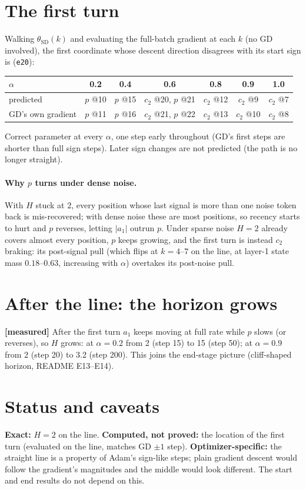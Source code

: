 \documentclass[11pt]{article}
\theoremstyle{remark}\newtheorem{remark}{Remark}
\begin{document}
\section{The first turn}
Walking $\theta_{\mathrm{SD}}(k)$ and evaluating the full-batch gradient at each $k$ (no GD involved),
the first coordinate whose descent direction disagrees with its start sign is (\texttt{e20}):
\begin{center}\begin{tabular}{lcccccc}\toprule
$\alpha$ & 0.2 & 0.4 & 0.6 & 0.8 & 0.9 & 1.0\\\midrule
predicted & $p$ @10 & $p$ @15 & $c_2$ @20, $p$ @21 & $c_2$ @12 & $c_2$ @9 & $c_2$ @7\\
GD's own gradient & $p$ @11 & $p$ @16 & $c_2$ @21, $p$ @22 & $c_2$ @13 & $c_2$ @10 & $c_2$ @8\\\bottomrule
\end{tabular}\end{center}
Correct parameter at every $\alpha$, one step early throughout (GD's first steps are shorter than full
sign steps). Later sign changes are not predicted (the path is no longer straight).

\paragraph{Why $p$ turns under dense noise.} With $H$ stuck at $2$, every position whose last signal
is more than one noise token back is mis-recovered; with dense noise these are most positions, so
recency starts to hurt and $p$ reverses, letting $|a_1|$ outrun $p$. Under sparse noise $H=2$ already
covers almost every position, $p$ keeps growing, and the first turn is instead $c_2$ braking: its
post-signal pull (which flips at $k=4$--$7$ on the line, at layer-1 state mass $0.18$--$0.63$,
increasing with $\alpha$) overtakes its post-noise pull.

\section{After the line: the horizon grows}
\textbf{[measured]} After the first turn $a_1$ keeps moving at full rate while $p$ slows (or reverses),
so $H$ grows: at $\alpha=0.2$ from 2 (step 15) to 15 (step 50); at $\alpha=0.9$ from 2 (step 20) to 3.2
(step 200). This joins the end-stage picture (cliff-shaped horizon, README E13--E14).

\section{Status and caveats}
\textbf{Exact:} $H=2$ on the line. \textbf{Computed, not proved:} the location of the first turn (evaluated
on the line, matches GD $\pm1$ step). \textbf{Optimizer-specific:} the straight line is a property of
Adam's sign-like steps; plain gradient descent would follow the gradient's magnitudes and the middle
would look different. The start and end results do not depend on this.
\end{document}
